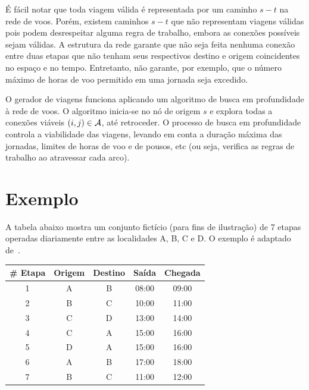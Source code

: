 É fácil notar que toda viagem válida é representada por um caminho $s-t$ na rede de voos. Porém,
existem caminhos $s-t$ que não representam viagens válidas pois podem desrespeitar alguma regra de
trabalho, embora as conexões possíveis sejam válidas. A estrutura da rede garante que não seja feita
nenhuma conexão entre duas etapas que não tenham seus respectivos destino e origem coincidentes no
espaço e no tempo. Entretanto, não garante, por exemplo, que o número máximo de horas de voo
permitido em uma jornada seja excedido. 

O gerador de viagens funciona aplicando um algoritmo de busca em profundidade à rede de voos. O
algoritmo inicia-se no nó de origem $s$ e explora todas a conexões viáveis $(i, j) \in \mathcal{A}$, até
retroceder. O processo de busca em profundidade controla a viabilidade das viagens, levando em conta
a duração máxima das jornadas, limites de horas de voo e de pousos, etc (ou seja, verifica as regras
de trabalho ao atravessar cada arco).


\section{Exemplo}
\label{sec:exemplo}

A tabela abaixo mostra um conjunto fictício (para fins de ilustração) de 7 etapas operadas 
diariamente entre as localidades A, B, C e D. O exemplo é adaptado de~\cite{barnhart03}. 

\begin{table}[ht]
	\begin{center}
		\begin{tabular}{ccccc}
			{\bf \# Etapa} & {\bf Origem} & {\bf Destino} & {\bf Saída} & {\bf Chegada} \\ \hline
			1 & A & B & 08:00 & 09:00 \\
			2 & B & C & 10:00 & 11:00 \\
			3 & C & D & 13:00 & 14:00 \\
			4 & C & A & 15:00 & 16:00 \\
			5 & D & A & 15:00 & 16:00 \\
			6 & A & B & 17:00 & 18:00 \\
			7 & B & C & 11:00 & 12:00 \\
		\end{tabular}
	\end{center}
\end{table}

